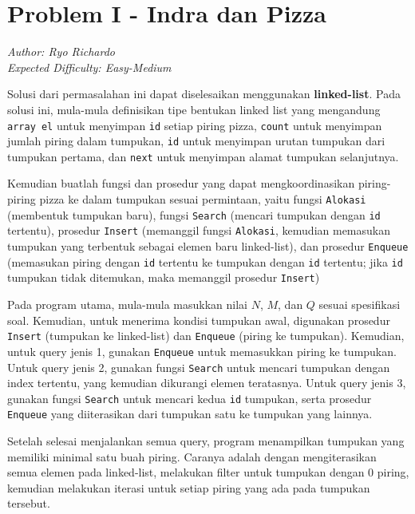 \section*{Problem I - Indra dan Pizza}
\textit{Author: Ryo Richardo}
\\
\textit{Expected Difficulty: Easy-Medium}

Solusi dari permasalahan ini dapat diselesaikan menggunakan \textbf{linked-list}. Pada solusi ini, mula-mula definisikan tipe bentukan linked list yang mengandung \lstinline|array el| untuk menyimpan \lstinline|id| setiap piring pizza, \lstinline|count| untuk menyimpan jumlah piring dalam tumpukan, \lstinline|id| untuk menyimpan urutan tumpukan dari tumpukan pertama, dan \lstinline|next| untuk menyimpan alamat tumpukan selanjutnya.

Kemudian buatlah fungsi dan prosedur yang dapat mengkoordinasikan piring-piring pizza ke dalam tumpukan sesuai permintaan, yaitu fungsi \lstinline|Alokasi| (membentuk tumpukan baru), fungsi \lstinline|Search| (mencari tumpukan dengan \lstinline|id| tertentu), prosedur \lstinline|Insert| (memanggil fungsi \lstinline|Alokasi|, kemudian memasukan tumpukan yang terbentuk sebagai elemen baru linked-list), dan prosedur \lstinline|Enqueue| (memasukan piring dengan \lstinline|id| tertentu ke tumpukan dengan \lstinline|id| tertentu; jika \lstinline|id| tumpukan tidak ditemukan, maka memanggil prosedur \lstinline|Insert|)

Pada program utama, mula-mula masukkan nilai $N$, $M$, dan $Q$ sesuai spesifikasi soal. Kemudian, untuk menerima kondisi tumpukan awal, digunakan prosedur \lstinline|Insert| (tumpukan ke linked-list) dan \lstinline|Enqueue| (piring ke tumpukan). Kemudian, untuk query jenis 1, gunakan \lstinline|Enqueue| untuk memasukkan piring ke tumpukan. Untuk query jenis 2, gunakan fungsi \lstinline|Search| untuk mencari tumpukan dengan index tertentu, yang kemudian dikurangi elemen teratasnya. Untuk query jenis 3, gunakan fungsi \lstinline|Search| untuk mencari kedua \lstinline|id| tumpukan, serta prosedur \lstinline|Enqueue| yang diiterasikan dari tumpukan satu ke tumpukan yang lainnya.

Setelah selesai menjalankan semua query, program menampilkan tumpukan yang memiliki minimal satu buah piring. Caranya adalah dengan mengiterasikan semua elemen pada linked-list, melakukan filter untuk tumpukan dengan 0 piring, kemudian melakukan iterasi untuk setiap piring yang ada pada tumpukan tersebut.

